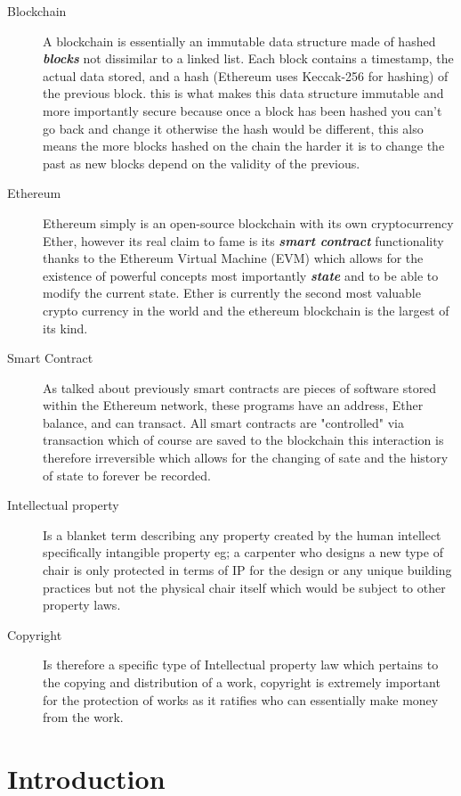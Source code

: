\documentclass[12pt]{report}
\newcommand{\keyword}[1]{\textbf{\textit{#1}}}
\begin{document}
\begin{description}
  \item[Blockchain] A blockchain is essentially an immutable data structure made of hashed \keyword{blocks} not dissimilar to a linked list. Each block contains a timestamp, the actual data stored, and a hash (Ethereum uses Keccak-256 for hashing) of the previous block. this is what makes this data structure immutable and more importantly secure because once a block has been hashed you can't go back and change it otherwise the hash would be different, this also means the more blocks hashed on the chain the harder it is to change the past as new blocks depend on the validity of the previous.
  \item[Ethereum] Ethereum simply is an open-source blockchain with its own cryptocurrency Ether, however its real claim to fame is its \keyword{smart contract} functionality thanks to the Ethereum Virtual Machine (EVM) which allows for the existence of powerful concepts most importantly \keyword{state} and to be able to modify the current state. Ether is currently the second most valuable crypto currency in the world and the ethereum blockchain is the largest of its kind.
  \item[Smart Contract] As talked about previously smart contracts are pieces of software stored within the Ethereum network, these programs have an address, Ether balance, and can transact. All smart contracts are "controlled" via transaction which of course are saved to the blockchain this interaction is therefore irreversible which allows for the changing of sate and the history of state to forever be recorded.
  \item[Intellectual property] Is a blanket term describing any property created by the human intellect specifically intangible property eg; a carpenter who designs a new type of chair is only protected in terms of IP for the design or any unique building practices but not the physical chair itself which would be subject to other property laws.
  \item[Copyright] Is therefore a specific type of Intellectual property law which pertains to the copying and distribution of a work, copyright is extremely important for the protection of works as it ratifies who can essentially make money from the work.
\end{description}

\chapter{Introduction}
\end{document}
